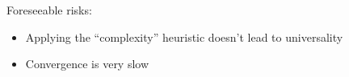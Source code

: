 Foreseeable risks:

\begin{itemize}
\item Applying the ``complexity'' heuristic doesn't lead to universality
\item Convergence is very slow
\end{itemize}
